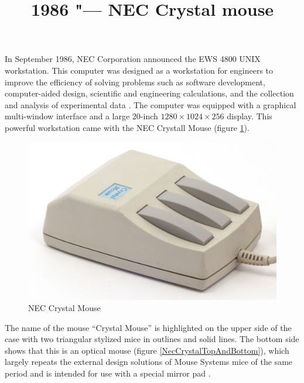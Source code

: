 \documentclass[11pt, a4paper]{article}
\begin{document}
\title{1986 "--- NEC Crystal mouse}
\date{}
\maketitle
{}
In September 1986, NEC Corporation announced the EWS 4800 UNIX workstation. This computer was designed as a workstation for engineers to improve the efficiency of solving problems such as software development, computer-aided design, scientific and engineering calculations, and the collection and analysis of experimental data \cite{yt}. The computer was equipped with a graphical multi-window interface and a large 20-inch $1280 \times 1024 \times 256$ display. This powerful workstation came with the NEC Crystall Mouse (figure \ref{fig:NECCrystalPic}).

\begin{figure}[h]
    \centering
    \includegraphics[scale=0.7]{1986_nec_crystal_mouse/necNorm_30.jpg}
    \caption{NEC Crystal Mouse}
    \label{fig:NECCrystalPic}
\end{figure}

The name of the mouse “Crystal Mouse” is highlighted on the upper side of the case with two triangular stylized mice in outlines and solid lines. The bottom side shows that this is an optical mouse (figure \ref{NecCrystalTopAndBottom}), which largely repeats the external design solutions of Mouse Systems mice of the same period and is intended for use with a special mirror pad \cite{photo}.
\end{document}
